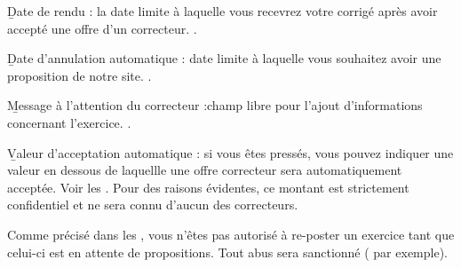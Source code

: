 \item \b{Date de rendu} : la date limite à laquelle vous recevrez votre corrigé après avoir accepté une offre d'un correcteur. .
\item \b{Date d'annulation automatique} : date limite à laquelle vous souhaitez avoir une proposition de notre site. .
\item \b{Message à l'attention du correcteur} :champ libre pour l'ajout d'informations concernant l'exercice. .
\item \b{Valeur d'acceptation automatique} : si vous êtes pressés, vous pouvez indiquer une valeur en dessous de laquellle une offre correcteur sera automatiquement acceptée. Voir les . Pour des raisons évidentes, ce montant est strictement confidentiel et ne sera connu d'aucun des correcteurs.

Comme précisé dans les , vous n'êtes pas autorisé à re-poster un exercice tant que celui-ci est en attente de propositions. Tout abus sera sanctionné ( par exemple).